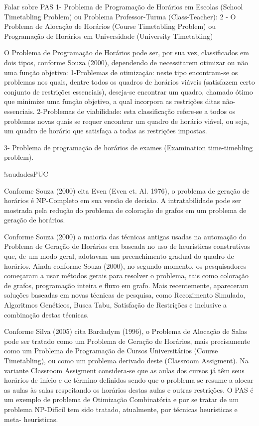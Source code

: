 \documentclass{abntpuc}
\begin{document}






Falar sobre PAS
1- Problema de Programação de Horários em Escolas (School Timetabling Problem) ou Problema Professor-Turma (Class-Teacher):
2 - O Problema de Alocação de Horários (Course Timetabling Problem) ou Programação de Horários em Universidade (University Timetabling) 

O Problema de Programação de Horários pode ser, por sua vez, classificados em
dois tipos, conforme Souza (2000), dependendo de necessitarem otimizar ou não uma
função objetivo:
1-Problemas de otimização: neste tipo encontram-se os problemas nos quais, dentre
todos os quadros de horários viáveis (satisfazem certo conjunto de restrições essenciais),
deseja-se encontrar um quadro, chamado ótimo que minimize uma função objetivo, a qual
incorpora as restrições ditas não-essenciais.
2-Problemas de viabilidade: esta classificação refere-se a todos os problemas novas
quais se requer encontrar um quadro de horário viável, ou seja, um quadro de horário que
satisfaça a todas as restrições impostas.



3- Problema de programação de horários de exames (Examination time-timebling problem).


!saudadesPUC

Conforme Souza (2000) cita Even (Even et. Al. 1976), o problema de geração de
horários é NP-Completo em sua versão de decisão. A intratabilidade pode ser mostrada
pela redução do problema de coloração de grafos em um problema de geração de horários.

Conforme Souza (2000) a maioria das técnicas antigas usadas na automação do
Problema de Geração de Horários era baseada no uso de heurísticas construtivas que, de
um modo geral, adotavam um preenchimento gradual do quadro de horários. Ainda
conforme Souza (2000), no segundo momento, os pesquisadores começaram a usar
métodos gerais para resolver o problema, tais como coloração de grafos, programação
inteira e fluxo em grafo. Mais recentemente, apareceram soluções baseadas em novas
técnicas de pesquisa, como Recozimento Simulado, Algoritmos Genéticos, Busca Tabu,
Satisfação de Restrições e inclusive a combinação destas técnicas.

Conforme Silva (2005) cita Bardadym (1996), o Problema de Alocação de Salas
pode ser tratado como um Problema de Geração de Horários, mais precisamente como um
Problema de Programação de Cursos Universitários (Course Timetabling), ou como um
problema derivado deste (Classroom Assigment). Na variante Classroom Assigment
considera-se que as aulas dos cursos já têm seus horários de início e de término definidos
sendo que o problema se resume a alocar as aulas às salas respeitando os horários destas
aulas e outras restrições.
O PAS é um exemplo de problema de Otimização Combinatória e por se tratar de
um problema NP-Difícil tem sido tratado, atualmente, por técnicas heurísticas e meta-
heurísticas.
\end{document}
